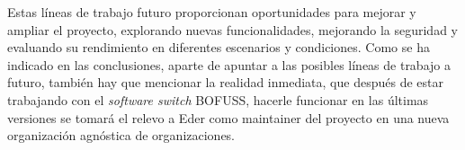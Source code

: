 Estas líneas de trabajo futuro proporcionan oportunidades para mejorar y ampliar el proyecto, explorando nuevas funcionalidades, mejorando la seguridad y evaluando su rendimiento en diferentes escenarios y condiciones. Como se ha indicado en las conclusiones, aparte de apuntar a las posibles líneas de trabajo a futuro, también hay que mencionar la realidad inmediata, que después de estar trabajando con el \textit{software switch} BOFUSS, hacerle funcionar en las últimas versiones se tomará el relevo a Eder como maintainer del proyecto en una nueva organización agnóstica de organizaciones.


